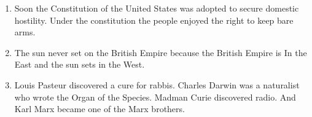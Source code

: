 \begin{enumerate}
\item
Soon the Constitution of the United States was adopted
to secure domestic hostility. Under the constitution the
people enjoyed the right to keep bare arms.

\item
The sun never set on the British Empire because the
British Empire is In the East and the sun sets in the West.

\item
Louis Pasteur discovered a cure for rabbis. Charles
Darwin was a naturalist who wrote the Organ of the Species.
Madman Curie discovered radio. And Karl Marx became one of
the Marx brothers.

\end{enumerate}
